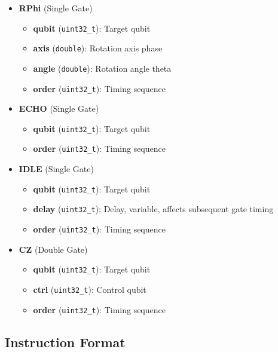 \documentclass[12pt, a4paper]{article}
\begin{document}
\begin{itemize}
    \item \textbf{RPhi} (Single Gate)
    \begin{itemize}
        \item \textbf{qubit} (\texttt{uint32\_t}): Target qubit
        \item \textbf{axis} (\texttt{double}): Rotation axis phase
        \item \textbf{angle} (\texttt{double}): Rotation angle theta
        \item \textbf{order} (\texttt{uint32\_t}): Timing sequence
    \end{itemize}
    
    \item \textbf{ECHO} (Single Gate)
    \begin{itemize}
        \item \textbf{qubit} (\texttt{uint32\_t}): Target qubit
        \item \textbf{order} (\texttt{uint32\_t}): Timing sequence
    \end{itemize}
    
    \item \textbf{IDLE} (Single Gate)
    \begin{itemize}
        \item \textbf{qubit} (\texttt{uint32\_t}): Target qubit
        \item \textbf{delay} (\texttt{uint32\_t}): Delay, variable, affects subsequent gate timing
        \item \textbf{order} (\texttt{uint32\_t}): Timing sequence
    \end{itemize}
    
    \item \textbf{CZ} (Double Gate)
    \begin{itemize}
        \item \textbf{qubit} (\texttt{uint32\_t}): Target qubit
        \item \textbf{ctrl} (\texttt{uint32\_t}): Control qubit
        \item \textbf{order} (\texttt{uint32\_t}): Timing sequence
    \end{itemize}
\end{itemize}

\subsection{Instruction Format}
\end{document}
